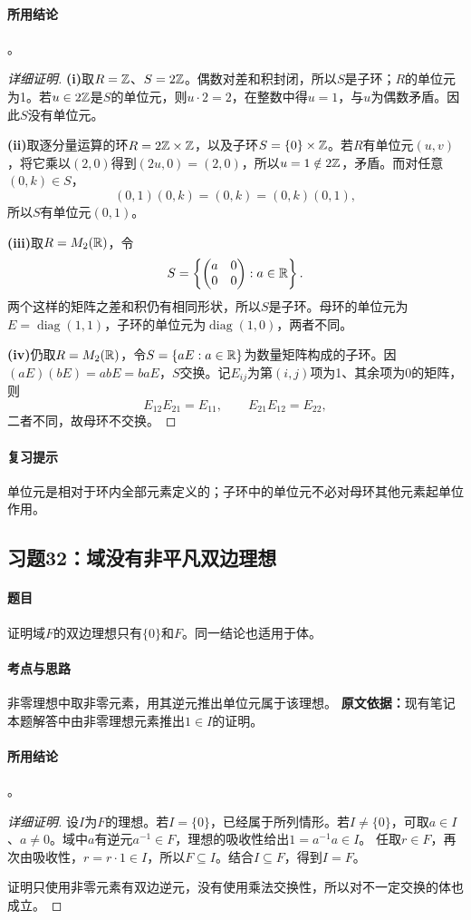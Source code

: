 \paragraph{所用结论}
。
\begin{proof}[详细证明]
\textbf{(i)}取$R=\mathbb Z$、$S=2\mathbb Z$。偶数对差和积封闭，所以$S$是子环；$R$的单位元为1。若$u\in2\mathbb Z$是$S$的单位元，则$u\cdot2=2$，在整数中得$u=1$，与$u$为偶数矛盾。因此$S$没有单位元。

\textbf{(ii)}取逐分量运算的环$R=2\mathbb Z\times\mathbb Z$，以及子环$S=\{0\}\times\mathbb Z$。若$R$有单位元$(u,v)$，将它乘以$(2,0)$得到$(2u,0)=(2,0)$，所以$u=1\notin2\mathbb Z$，矛盾。而对任意$(0,k)\in S$，
\[
(0,1)(0,k)=(0,k)=(0,k)(0,1),
\]
所以$S$有单位元$(0,1)$。

\textbf{(iii)}取$R=M_2(\mathbb R)$，令
\[
S=\left\{\begin{pmatrix}a&0\\0&0\end{pmatrix}:a\in\mathbb R\right\}.
\]
两个这样的矩阵之差和积仍有相同形状，所以$S$是子环。母环的单位元为$E=\operatorname{diag}(1,1)$，子环的单位元为$\operatorname{diag}(1,0)$，两者不同。

\textbf{(iv)}仍取$R=M_2(\mathbb R)$，令$S=\{aE:a\in\mathbb R\}$为数量矩阵构成的子环。因$(aE)(bE)=abE=baE$，$S$交换。记$E_{ij}$为第$(i,j)$项为1、其余项为0的矩阵，则
\[
E_{12}E_{21}=E_{11},\qquad E_{21}E_{12}=E_{22},
\]
二者不同，故母环不交换。
\end{proof}
\paragraph{复习提示}
单位元是相对于环内全部元素定义的；子环中的单位元不必对母环其他元素起单位作用。

\subsection{习题32：域没有非平凡双边理想}
\paragraph{题目}
证明域$F$的双边理想只有$\{0\}$和$F$。同一结论也适用于体。
\paragraph{考点与思路}
非零理想中取非零元素，用其逆元推出单位元属于该理想。
\textbf{原文依据：}现有笔记本题解答中由非零理想元素推出$1\in I$的证明。
\paragraph{所用结论}
。
\begin{proof}[详细证明]
设$I$为$F$的理想。若$I=\{0\}$，已经属于所列情形。若$I\ne\{0\}$，可取$a\in I$、$a\ne0$。域中$a$有逆元$a^{-1}\in F$，理想的吸收性给出$1=a^{-1}a\in I$。
任取$r\in F$，再次由吸收性，$r=r\cdot1\in I$，所以$F\subseteq I$。结合$I\subseteq F$，得到$I=F$。

证明只使用非零元素有双边逆元，没有使用乘法交换性，所以对不一定交换的体也成立。
\end{proof}
